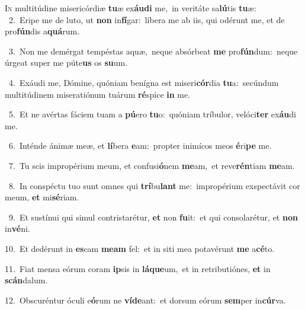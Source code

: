 \lettrine{\initial\textcolor{\initialcolor}{I}}{n} multitúdine misericórdiæ \textbf{tu}\-æ ex\-\textbf{áu}\-\textbf{di} me,~\star in veritáte sa\-\textbf{lú}\-tis \textbf{tu}\-æ:\\
{\numbfont\textcolor{\numbcolor}{~2.}}~Eripe me de luto, ut \textbf{non} in\-\textbf{fí}\-gar:~\star líbera me ab iis, qui odérunt me, et de pro\-\textbf{fún}\-dis a\-\textbf{quá}\-rum.\par
{\numbfont\textcolor{\numbcolor}{~3.}}~Non me demérgat tempéstas aquæ,~\dagger neque absórbeat \textbf{me} pro\-\textbf{fún}\-dum:~\star neque úrgeat super me púte\textbf{us} os \textbf{su}\-um.\par
{\numbfont\textcolor{\numbcolor}{~4.}}~Exáudi me, Dómine, quóniam benígna est miseri\-\textbf{cór}\-dia \textbf{tu}\-a:~\star secúndum multitúdinem miseratiónum tuárum \textbf{ré}\-spice \textbf{in} me.\par
{\numbfont\textcolor{\numbcolor}{~5.}}~Et ne avértas fáciem tuam a \textbf{pú}\-ero \textbf{tu}\-o:~\star quóniam tríbulor, velóci\textbf{ter} ex\-\textbf{áu}\-di me.\par
{\numbfont\textcolor{\numbcolor}{~6.}}~Inténde ánimæ meæ, et \textbf{lí}\-bera \textbf{e}\-am:~\star propter inimícos meos \textbf{é}\-ri\textbf{pe} me.\par
{\numbfont\textcolor{\numbcolor}{~7.}}~Tu scis impropérium meum, et confusi\-\textbf{ó}\-nem \textbf{me}\-am,~\star et reve\-\textbf{rén}\-tiam \textbf{me}\-am.\par
{\numbfont\textcolor{\numbcolor}{~8.}}~In conspéctu tuo sunt omnes qui \textbf{trí}\-bu\textbf{lant} me:~\star impropérium exspectávit cor meum, \textbf{et} mi\-\textbf{sé}\-riam.\par
{\numbfont\textcolor{\numbcolor}{~9.}}~Et sustínui qui simul contristarétur, \textbf{et} non \textbf{fu}\-it:~\star et qui consolarétur, et \textbf{non} in\-\textbf{vé}\-ni.\par
{\numbfont\textcolor{\numbcolor}{10.}}~Et dedérunt in \textbf{es}\-cam \textbf{me}\-\textbf{am} fel:~\star et in siti mea potavérunt \textbf{me} a\-\textbf{cé}\-to.\par
{\numbfont\textcolor{\numbcolor}{11.}}~Fiat mensa eórum coram \textbf{ip}\-sis in \textbf{lá}\-\textbf{que}um,~\star et in retributiónes, \textbf{et} in \textbf{scán}\-dalum.\par
{\numbfont\textcolor{\numbcolor}{12.}}~Obscuréntur óculi e\-\textbf{ó}\-rum ne \textbf{ví}\-\textbf{de}ant:~\star et dorsum eórum \textbf{sem}\-per in\-\textbf{cúr}\-va.\par
